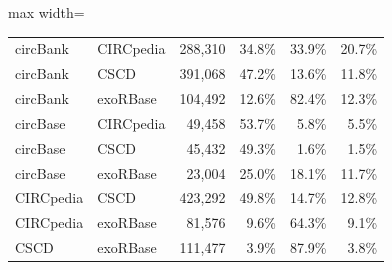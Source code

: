 \begin{table}[ht]
\begin{adjustbox}{max width=\textwidth}
\begin{tabular}{llrrrr}
    circBank & CIRCpedia & 288,310 & 34.8\% & 33.9\% & 20.7\% \\
    circBank & CSCD & 391,068 & 47.2\% & 13.6\% & 11.8\% \\
    circBank & exoRBase & 104,492 & 12.6\% & 82.4\% & 12.3\% \\
    circBase & CIRCpedia & 49,458 & 53.7\% & 5.8\% & 5.5\% \\
    circBase & CSCD & 45,432 & 49.3\% & 1.6\% & 1.5\% \\
    circBase & exoRBase & 23,004 & 25.0\% & 18.1\% & 11.7\% \\
    CIRCpedia & CSCD & 423,292 & 49.8\% & 14.7\% & 12.8\% \\
    CIRCpedia & exoRBase & 81,576 & 9.6\% & 64.3\% & 9.1\% \\
    CSCD & exoRBase & 111,477 & 3.9\% & 87.9\% & 3.8\% \\
    \bottomrule
  \end{tabular}
  \end{adjustbox}
\end{table}

\clearpage 

